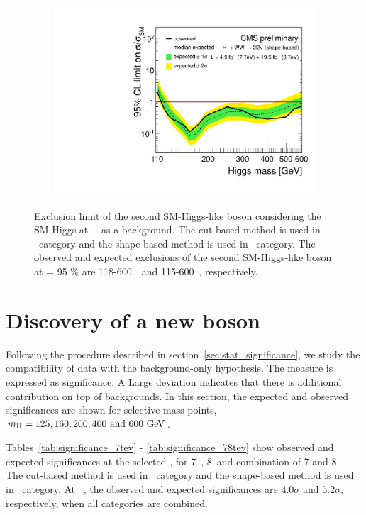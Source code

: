 \begin{figure}[htp] 
\centering 
\begin{tabular}{c} 
\includegraphics[width=0.9\textwidth]{figures/ana_Moriond13_2D_SMH_7p8TeV_bdt_from110to600_logx1_logy1.pdf} 
\end{tabular} 
\caption{Exclusion limit of the second SM-Higgs-like boson considering the 
SM Higgs at ~\GeV\ as a background.
The cut-based method is used in \SF\ category and the shape-based method 
is used in \DF\ category.
The observed and expected exclusions of the second SM-Higgs-like boson at \CLs = 95 \% 
are 118-600~\GeV\ and 115-600~\GeV, respectively.} 
\label{fig:limit78_secondhiggs} 
\end{figure} 




\section{Discovery of a new boson}

Following the procedure described in section~\ref{sec:stat_significance}, 
we study the compatibility of data with the background-only hypothesis. 
The measure is expressed as significance. A Large deviation indicates 
that there is additional contribution on top of backgrounds. 
In this section, the expected and observed significances are shown
for selective mass points, $m_{\mathrm{H}} = 125, 160, 200, 400 \textrm{ and } 600~\mathrm{Ge\kern -0.1em V}$.  

Tables~\ref{tab:significance_7tev} - \ref{tab:significance_78tev}  
show observed and expected significances at the selected \mHi, 
for 7~\TeV, 8~\TeV and combination of 7 and 8~\TeV.
The cut-based method is used in \SF\ category 
and the shape-based method is used in \DF\ category.
At ~\GeV, the observed and expected significances
are $4.0\sigma$ and $5.2\sigma$, respectively, 
when all categories are combined.

